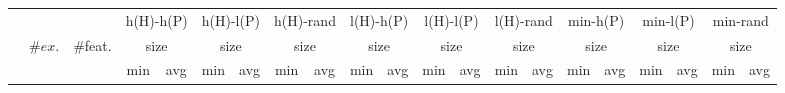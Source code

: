 \begin{tabular}{lccrrrrrrrrrrrrrrrrrr}
\toprule
& && \multicolumn{2}{c}{h(H)-h(P)} & \multicolumn{2}{c}{h(H)-l(P)} & \multicolumn{2}{c}{h(H)-rand} & \multicolumn{2}{c}{l(H)-h(P)} & \multicolumn{2}{c}{l(H)-l(P)} & \multicolumn{2}{c}{l(H)-rand} & \multicolumn{2}{c}{min-h(P)} & \multicolumn{2}{c}{min-l(P)} & \multicolumn{2}{c}{min-rand}\\
\cmidrule(rr){4-5}\cmidrule(rr){6-7}\cmidrule(rr){8-9}\cmidrule(rr){10-11}\cmidrule(rr){12-13}\cmidrule(rr){14-15}\cmidrule(rr){16-17}\cmidrule(rr){18-19}\cmidrule(rr){20-21}
&\multirow{2}{*}{$\#ex.$} & \multirow{2}{*}{\#feat.} &  \multicolumn{2}{c}{size} & \multicolumn{2}{c}{size} & \multicolumn{2}{c}{size} & \multicolumn{2}{c}{size} & \multicolumn{2}{c}{size} & \multicolumn{2}{c}{size} & \multicolumn{2}{c}{size} & \multicolumn{2}{c}{size} & \multicolumn{2}{c}{size} \\\cmidrule(rl){4-5}\cmidrule(rl){6-7}\cmidrule(rl){8-9}\cmidrule(rl){10-11}\cmidrule(rl){12-13}\cmidrule(rl){14-15}\cmidrule(rl){16-17}\cmidrule(rl){18-19}\cmidrule(rl){20-21}
&& & \multicolumn{1}{c}{min} & \multicolumn{1}{c}{avg} & \multicolumn{1}{c}{min} & \multicolumn{1}{c}{avg} & \multicolumn{1}{c}{min} & \multicolumn{1}{c}{avg} & \multicolumn{1}{c}{min} & \multicolumn{1}{c}{avg} & \multicolumn{1}{c}{min} & \multicolumn{1}{c}{avg} & \multicolumn{1}{c}{min} & \multicolumn{1}{c}{avg} & \multicolumn{1}{c}{min} & \multicolumn{1}{c}{avg} & \multicolumn{1}{c}{min} & \multicolumn{1}{c}{avg} & \multicolumn{1}{c}{min} & \multicolumn{1}{c}{avg} \\
\midrule


\end{tabular}
